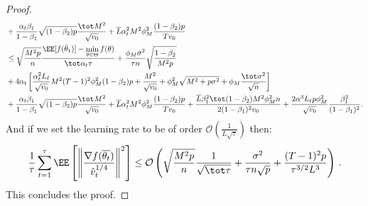 \documentclass[nohyperref]{article}
\begin{document}
\begin{proof}
\begin{align*}
   &  +\frac{\alpha_t \beta_1}{1-\beta_1}  \sqrt{(1-\beta_2)p} \frac{\tot M^2}{\sqrt{v_0}} +\overline{L} \alpha_t^2 M^2 \phi_M^2 \frac{(1-\beta_2)p}{Tv_0} \nonumber\\
   & \leq   \sqrt{\frac{M^2 p}{n}}  \frac{ \EE[f(\bar{\theta}_1)]  - \min \limits_{\theta \in \Theta} f(\theta)}{\tot \alpha_t \tau} +      \frac{\phi_M   \sigma^2}{\tau n} \sqrt{\frac{1 - \beta_2}{M^2 p}  } \nonumber\\
    &   +4\alpha_t \left[ \frac{\alpha_t^2 L_\ell}{\sqrt{v_0}}  M^2 (T-1)^2 \phi_M^2 (1-\beta_2)p + \frac{M^2}{\sqrt{v_0}}+\phi_M^2\sqrt{M^2+p\sigma^2} + \phi_M \frac{\tot \sigma^2}{\sqrt{n}}\right]   \nonumber\\
   &  +\frac{\alpha_t \beta_1}{1-\beta_1}  \sqrt{(1-\beta_2)p} \frac{\tot M^2}{\sqrt{v_0}} +\overline{L} \alpha_t^2 M^2 \phi_M^2 \frac{(1-\beta_2)p}{Tv_0}  + \frac{ \overline{L}\beta_1^2\tot(1-\beta_2)M^2 \phi^2_M n}{2(1-\beta_1)^2 v_0}  +\frac{2\alpha^3 L_\ell p\phi_M^2}{ \sqrt{v_0}}\frac{\beta_1^2}{(1-\beta_1)^2}.
\end{align*}
 And if we set the learning rate to be of order $\mathcal{O}(\frac{1}{L \sqrt{\tau}})$ then:
 \begin{align*}
     \frac{1}{\tau}\sum_{t=1}^\tau  \EE\left[ \left\| \frac{\nabla f(\overline{\theta_t})}{\hat v_t^{1/4}}   \right \|^2 \right] \leq \mathcal{O}\left( \sqrt{\frac{M^2 p}{n}} \frac{1}{\sqrt{\tot \tau}} + \frac{\sigma^2 }{\tau n\sqrt{p}}+\frac{(T-1)^2p}{\tau^{3/2}L^3}\right) \, .
\end{align*}
This concludes the proof.

\end{proof}
\end{document}
